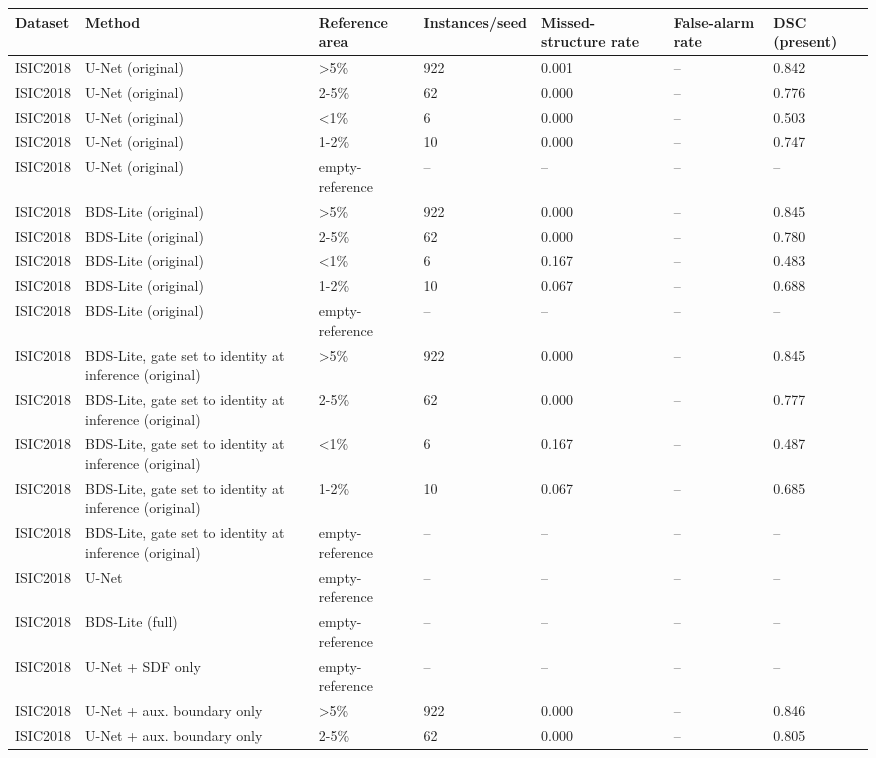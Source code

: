 \begin{longtable}{lllllll}
\toprule
Dataset & Method & Reference area & Instances/seed & Missed-structure rate & False-alarm rate & DSC (present) \\
\midrule
ISIC2018 & U-Net (original) & >5\% & 922 & 0.001 & -- & 0.842 \\
ISIC2018 & U-Net (original) & 2-5\% & 62 & 0.000 & -- & 0.776 \\
ISIC2018 & U-Net (original) & <1\% & 6 & 0.000 & -- & 0.503 \\
ISIC2018 & U-Net (original) & 1-2\% & 10 & 0.000 & -- & 0.747 \\
ISIC2018 & U-Net (original) & empty-reference & -- & -- & -- & -- \\
ISIC2018 & BDS-Lite (original) & >5\% & 922 & 0.000 & -- & 0.845 \\
ISIC2018 & BDS-Lite (original) & 2-5\% & 62 & 0.000 & -- & 0.780 \\
ISIC2018 & BDS-Lite (original) & <1\% & 6 & 0.167 & -- & 0.483 \\
ISIC2018 & BDS-Lite (original) & 1-2\% & 10 & 0.067 & -- & 0.688 \\
ISIC2018 & BDS-Lite (original) & empty-reference & -- & -- & -- & -- \\
ISIC2018 & BDS-Lite, gate set to identity at inference (original) & >5\% & 922 & 0.000 & -- & 0.845 \\
ISIC2018 & BDS-Lite, gate set to identity at inference (original) & 2-5\% & 62 & 0.000 & -- & 0.777 \\
ISIC2018 & BDS-Lite, gate set to identity at inference (original) & <1\% & 6 & 0.167 & -- & 0.487 \\
ISIC2018 & BDS-Lite, gate set to identity at inference (original) & 1-2\% & 10 & 0.067 & -- & 0.685 \\
ISIC2018 & BDS-Lite, gate set to identity at inference (original) & empty-reference & -- & -- & -- & -- \\
ISIC2018 & U-Net & empty-reference & -- & -- & -- & -- \\
ISIC2018 & BDS-Lite (full) & empty-reference & -- & -- & -- & -- \\
ISIC2018 & U-Net + SDF only & empty-reference & -- & -- & -- & -- \\
ISIC2018 & U-Net + aux. boundary only & >5\% & 922 & 0.000 & -- & 0.846 \\
ISIC2018 & U-Net + aux. boundary only & 2-5\% & 62 & 0.000 & -- & 0.805 \\

\end{longtable}

